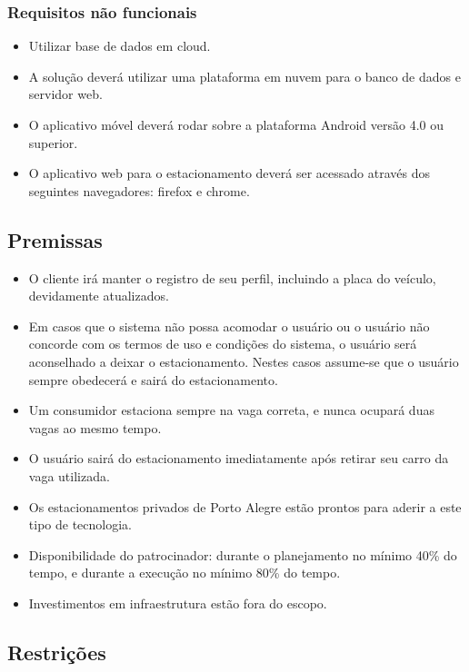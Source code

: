 \subsubsection{Requisitos não funcionais}

\begin{itemize}
	\item Utilizar base de dados em cloud.
	\item A solução deverá utilizar uma plataforma em nuvem para o banco de dados e servidor web.
	\item O aplicativo móvel deverá rodar sobre a plataforma Android versão 4.0 ou superior.
	\item O aplicativo web para o estacionamento deverá ser acessado através dos seguintes navegadores: firefox e chrome.
\end{itemize}

\subsection{Premissas}

\begin{itemize}
	\item O cliente irá manter o registro de seu perfil, incluindo a placa do veículo, devidamente atualizados.
	\item Em casos que o sistema não possa acomodar o usuário ou o usuário não concorde com os termos de uso e condições do sistema, o usuário será aconselhado a deixar o estacionamento. Nestes casos assume-se que o usuário sempre obedecerá e sairá do estacionamento.
	\item Um consumidor estaciona sempre na vaga correta, e nunca ocupará duas vagas ao mesmo tempo.
	\item O usuário sairá do estacionamento imediatamente após retirar seu carro da vaga utilizada.
	\item Os estacionamentos privados de Porto Alegre estão prontos para aderir a este tipo de tecnologia.
	\item Disponibilidade do patrocinador: durante o planejamento no mínimo 40\% do tempo, e durante a execução no mínimo 80\% do tempo.
	\item Investimentos em infraestrutura estão fora do escopo.
\end{itemize}

\subsection{Restrições}

